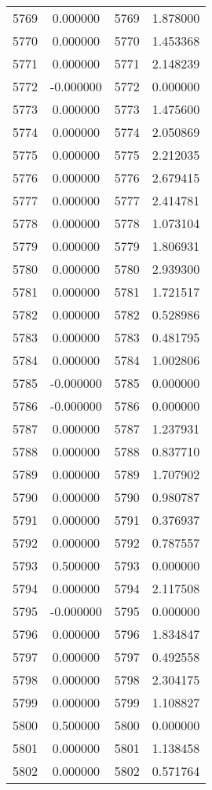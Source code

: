 \documentclass[12pt]{article}
\begin{document}
\begin{longtable}{@{}cccc@{}}
5769 & 0.000000 & 5769 & 1.878000 \\
5770 & 0.000000 & 5770 & 1.453368 \\
5771 & 0.000000 & 5771 & 2.148239 \\
5772 & -0.000000 & 5772 & 0.000000 \\
5773 & 0.000000 & 5773 & 1.475600 \\
5774 & 0.000000 & 5774 & 2.050869 \\
5775 & 0.000000 & 5775 & 2.212035 \\
5776 & 0.000000 & 5776 & 2.679415 \\
5777 & 0.000000 & 5777 & 2.414781 \\
5778 & 0.000000 & 5778 & 1.073104 \\
5779 & 0.000000 & 5779 & 1.806931 \\
5780 & 0.000000 & 5780 & 2.939300 \\
5781 & 0.000000 & 5781 & 1.721517 \\
5782 & 0.000000 & 5782 & 0.528986 \\
5783 & 0.000000 & 5783 & 0.481795 \\
5784 & 0.000000 & 5784 & 1.002806 \\
5785 & -0.000000 & 5785 & 0.000000 \\
5786 & -0.000000 & 5786 & 0.000000 \\
5787 & 0.000000 & 5787 & 1.237931 \\
5788 & 0.000000 & 5788 & 0.837710 \\
5789 & 0.000000 & 5789 & 1.707902 \\
5790 & 0.000000 & 5790 & 0.980787 \\
5791 & 0.000000 & 5791 & 0.376937 \\
5792 & 0.000000 & 5792 & 0.787557 \\
5793 & 0.500000 & 5793 & 0.000000 \\
5794 & 0.000000 & 5794 & 2.117508 \\
5795 & -0.000000 & 5795 & 0.000000 \\
5796 & 0.000000 & 5796 & 1.834847 \\
5797 & 0.000000 & 5797 & 0.492558 \\
5798 & 0.000000 & 5798 & 2.304175 \\
5799 & 0.000000 & 5799 & 1.108827 \\
5800 & 0.500000 & 5800 & 0.000000 \\
5801 & 0.000000 & 5801 & 1.138458 \\
5802 & 0.000000 & 5802 & 0.571764 \\

\end{longtable}
\end{document}
